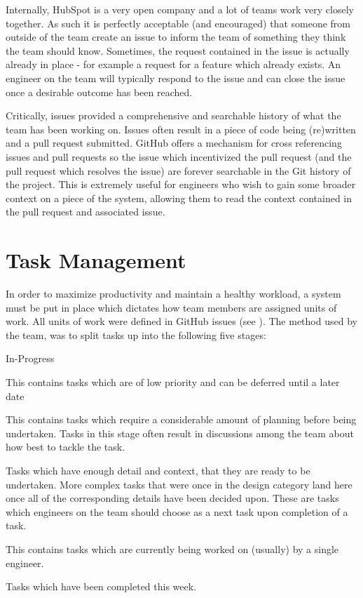 Internally, HubSpot is a very open company and a lot of teams work very closely together. As such it is perfectly acceptable (and encouraged) that someone from outside of the team create an issue to inform the team of something they think the team should know. Sometimes, the request contained in the issue is actually already in place - for example a request for a feature which already exists. An engineer on the team will typically respond to the issue and can close the issue once a desirable outcome has been reached. 

Critically, issues provided a comprehensive and searchable history of what the team has been working on. Issues often result in a piece of code being (re)written and a pull request submitted. GitHub offers a mechanism for cross referencing issues and pull requests so the issue which incentivized the pull request (and the pull request which resolves the issue) are forever searchable in the Git history of the project. This is extremely useful for engineers who wish to gain some broader context on a piece of the system, allowing them to read the context contained in the pull request and associated issue. 

\section{Task Management}
In order to maximize productivity and maintain a healthy workload, a system must be put in place which dictates how team members are assigned units of work. All units of work were defined in GitHub issues (see ). The method used by the \team{} team, was to split tasks up into the following five stages:

\begin{labeling}{In-Progress}
	\item [Backlog] This contains tasks which are of low priority and can be deferred until a later date
	\item [Design] This contains tasks which require a considerable amount of planning before being undertaken. Tasks in this stage often result in discussions among the team about how best to tackle the task.
	\item [Ready] Tasks which have enough detail and context, that they are ready to be undertaken. More complex tasks that were once in the design category land here once all of the corresponding details have been decided upon. These are tasks which engineers on the team should choose as a next task upon completion of a task.
	\item [In-Progress] This contains tasks which are currently being worked on (usually) by a single engineer.
	\item [Completed] Tasks which have been completed this week.
\end{labeling}

